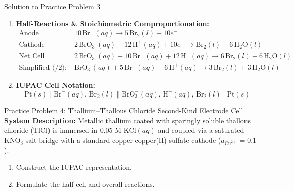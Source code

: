 \documentclass[10pt,a4paper]{article}
\begin{document}
\begin{solutionbox}{Solution to Practice Problem 3}
\begin{enumerate}[label=(\alph*)]
    \item \textbf{Half-Reactions \& Stoichiometric Comproportionation:}
    \begin{align*}
        \text{Anode (Oxidation):} \quad & 10\,\text{Br}^-(aq) \longrightarrow 5\,\text{Br}_2(l) + 10e^- \\
        \text{Cathode (Reduction):} \quad & 2\,\text{BrO}_3^-(aq) + 12\,\text{H}^+(aq) + 10e^- \longrightarrow \text{Br}_2(l) + 6\,\text{H}_2\text{O}(l) \\
        \text{Net Cell Reaction:} \quad & 2\,\text{BrO}_3^-(aq) + 10\,\text{Br}^-(aq) + 12\,\text{H}^+(aq) \longrightarrow 6\,\text{Br}_2(l) + 6\,\text{H}_2\text{O}(l) \\
        \text{Simplified ($/2$):} \quad & \text{BrO}_3^-(aq) + 5\,\text{Br}^-(aq) + 6\,\text{H}^+(aq) \longrightarrow 3\,\text{Br}_2(l) + 3\,\text{H}_2\text{O}(l)
    \end{align*}
    \item \textbf{IUPAC Cell Notation:}
    $$\text{Pt}(s) \mid \text{Br}^-(aq),\, \text{Br}_2(l) \parallel \text{BrO}_3^-(aq),\, \text{H}^+(aq),\, \text{Br}_2(l) \mid \text{Pt}(s)$$
\end{enumerate}
\end{solutionbox}

\begin{exercisebox}{Practice Problem 4: Thallium--Thallous Chloride Second-Kind Electrode Cell}
\textbf{System Description:}
Metallic thallium coated with sparingly soluble thallous chloride ($\text{TlCl}$) is immersed in $0.05\text{ M }\text{KCl}(aq)$ and coupled via a saturated $\text{KNO}_3$ salt bridge with a standard copper-copper(II) sulfate cathode ($a_{\text{Cu}^{2+}} = 0.1$).
\begin{enumerate}[label=(\alph*)]
    \item Construct the IUPAC representation.
    \item Formulate the half-cell and overall reactions.
\end{enumerate}
\end{exercisebox}
\end{document}
